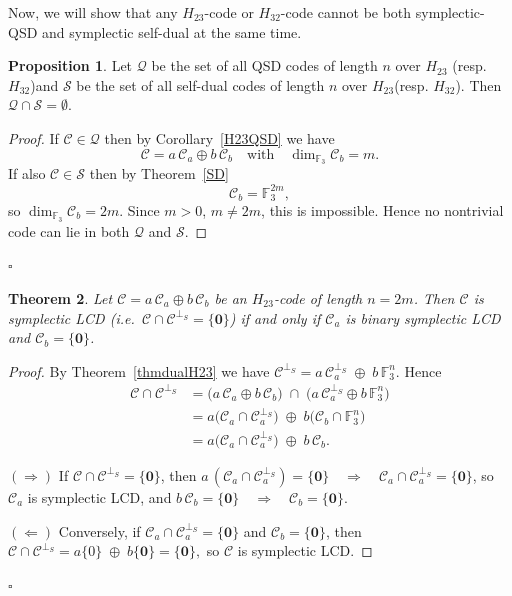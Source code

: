\documentclass[11pt,a4paper]{article}
\def\qed{\hfill {$\square$}\goodbreak \medskip}
\newtheorem{theorem}{Theorem}[section]
\theoremstyle{definition}
\newtheorem{proposition}[theorem]{Proposition}
\numberwithin{equation}{section}
\newcommand{\F}{\mathbb{F}}
\def\C{{\mathcal{C}}}
\begin{document}
Now, we will show that any $H_{23}$-code or  $H_{32}$-code cannot be both symplectic-QSD and symplectic self-dual at the same time. 
\begin{proposition}\label{QSDnotSD}
Let $\mathcal{Q}$ be the set of all QSD codes of length $n$ over $H_{23}$ (resp. $H_{32}$)and $\mathcal{S}$ be the set of all self-dual
codes of length $n$ over $H_{23}$(resp. $H_{32}$). Then $\mathcal{Q}\cap \mathcal{S}=\emptyset$.
\end{proposition}
\begin{proof}
If \(\C\in\mathcal Q\) then by Corollary~\ref{H23QSD} we have
\[
\C=a\,\C_a\oplus b\,\C_b
\quad\text{with}\quad
\dim_{\F_3}\C_b = m.
\]
If also \(\C\in\mathcal S\) then by Theorem~\ref{SD}
\[
\C_b = \F_3^{2m},
\]
so \(\dim_{\F_3}\C_b=2m\).  Since \(m>0\), \(m\neq2m\), this is impossible.  Hence no nontrivial code can lie in both \(\mathcal Q\) and \(\mathcal S\).
\end{proof}
\qed

\begin{theorem}\label{LCDH23}
Let \(\C=a\,\C_a\oplus b\,\C_b\) be an \(H_{23}\)-code of length \(n=2m\).  Then \(\C\) is symplectic LCD (i.e.\ \(\C\cap\C^{\perp_S}=\{\mathbf{0}\}\)) if and only if \(\C_a\) is binary symplectic LCD and \(\C_b=\{\mathbf{0}\}\).
\end{theorem}
\begin{proof}
By Theorem~\ref{thmdualH23} we have $\C^{\perp_S}
= a\,\C_a^{\perp_S}\;\oplus\;b\,\F_3^n.$
Hence
\begin{align*}
\C\cap\C^{\perp_S}
&=\bigl(a\,\C_a\oplus b\,\C_b\bigr)\;\cap\;\bigl(a\,\C_a^{\perp_S}\oplus b\,\F_3^n\bigr)\\
&=a\bigl(\C_a\cap\C_a^{\perp_S}\bigr)\;\oplus\;b\bigl(\C_b\cap\F_3^n\bigr)\\
&=a\bigl(\C_a\cap\C_a^{\perp_S}\bigr)\;\oplus\;b\,\C_b.
\end{align*}

\noindent
\((\Rightarrow)\) If \(\C\cap\C^{\perp_S}=\{\mathbf{0}\}\), then $a\,(\C_a\cap\C_a^{\perp_S})=\{\mathbf{0}\}
\quad\Longrightarrow\quad
\C_a\cap\C_a^{\perp_S}=\{\mathbf{0}\}$, so \(\C_a\) is symplectic LCD, and $b\,\C_b=\{\mathbf{0}\}
\quad\Longrightarrow\quad
\C_b=\{\mathbf{0}\}.$

\noindent
\((\Leftarrow)\) Conversely, if \(\C_a\cap\C_a^{\perp_S}=\{\mathbf{0}\}\) and \(\C_b=\{\mathbf{0}\}\), then $\C\cap\C^{\perp_S}
= a\{0\}\;\oplus\;b\{\mathbf{0}\}
=\{\mathbf{0}\},$ so \(\C\) is symplectic LCD.
\end{proof}
\qed
\end{document}
